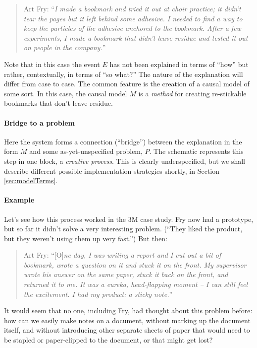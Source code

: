 \begin{quote}
Art Fry: ``\emph{I made a bookmark and tried it out at choir practice; it
didn't tear the pages but it left behind some adhesive. I needed to
find a way to keep the particles of the adhesive anchored to the
bookmark.  After a few experiments, I made a bookmark that didn’t
leave residue and tested it out on people in the company.}''
\end{quote}
Note that in this case the event $E$ has not been explained in terms
of ``how'' but rather, contextually, in terms of ``so what?''  The
nature of the explanation will differ from case to case.  The common
feature is the creation of a causal model of some sort.  In this case,
the causal model $M$ is a \emph{method} for creating re-stickable
bookmarks that don't leave residue.

\paragraph{Bridge to a problem}
Here the system forms a connection (``bridge'') between the
explanation in the form $M$ and some as-yet-unspecified problem, $P$.
The schematic represents this step in one block, a \emph{creative
  process}.  This is clearly underspecified, but we shall describe
different possible implementation strategies shortly, in Section
\ref{sec:modelTerms}.

\paragraph{\textbf{\upshape Example}}
Let's see how this process worked in the 3M case study.  Fry now had a
prototype, but so far it didn't solve a very interesting problem.
(``They liked the product, but they weren’t using them up very
fast.'')  But then:

\begin{quote}
Art Fry: ``[O]\emph{ne day, I was writing a report and I cut out a bit
  of bookmark, wrote a question on it and stuck it on the front. My
  supervisor wrote his answer on the same paper, stuck it back on the
  front, and returned it to me. It was a eureka, head-flapping moment
  -- I can still feel the excitement.  I had my product: a sticky
  note.}''
\end{quote}

It would seem that no one, including Fry, had thought about this
problem before: how can we easily make notes on a document, without
marking up the document itself, and without introducing other separate
sheets of paper that would need to be stapled or paper-clipped to the
document, or that might get lost?


